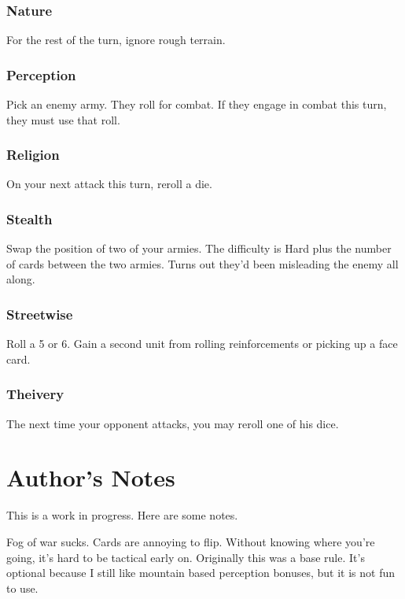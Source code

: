 \documentclass{article}
\begin{document}
\subsubsection{Nature}

For the rest of the turn, ignore rough terrain.

\subsubsection{Perception}

Pick an enemy army.  They roll for combat.  If they engage in combat this turn, they must use that roll.

\subsubsection{Religion}

On your next attack this turn, reroll a die.

\subsubsection{Stealth}

Swap the position of two of your armies.  The difficulty is Hard plus the number of cards between the two armies.  Turns out they'd been misleading the enemy all along.

\subsubsection{Streetwise}

Roll a 5 or 6.  Gain a second unit from rolling reinforcements or picking up a face card.

\subsubsection{Theivery}

The next time your opponent attacks, you may reroll one of his dice.

\newpage
\section{Author's Notes}

This is a work in progress.  Here are some notes.

Fog of war sucks.  Cards are annoying to flip.  Without knowing where you're going, it's hard to be tactical early on.  Originally this was a base rule.  It's optional because I still like mountain based perception bonuses, but it is not fun to use.
\end{document}
